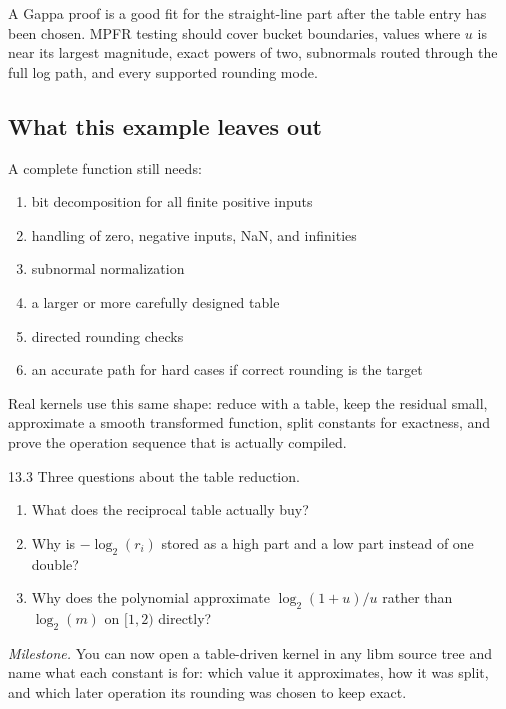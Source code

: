 \documentclass[manuscript, nonacm]{acmart}
\begin{document}
    A Gappa proof is a good fit for the straight-line part after the table entry
    has been chosen. MPFR testing should cover bucket boundaries, values where
    $u$ is near its largest magnitude, exact powers of two, subnormals routed
    through the full log path, and every supported rounding mode.

    \subsection{What this example leaves out}

    A complete function still needs:

    \begin{enumerate}
        \item bit decomposition for all finite positive inputs
        \item handling of zero, negative inputs, NaN, and infinities
        \item subnormal normalization
        \item a larger or more carefully designed table
        \item directed rounding checks
        \item an accurate path for hard cases if correct rounding is the target
    \end{enumerate}

    Real kernels use this same shape: reduce with a table, keep the residual
    small, approximate a smooth transformed function, split constants for
    exactness, and prove the operation sequence that is actually compiled.

    \begin{checkpoint}{13.3}
        Three questions about the table reduction.
        \begin{enumerate}
            \item What does the reciprocal table actually buy?
            \item Why is $-\log_2(r_i)$ stored as a high part and a low part instead
            of one double?
            \item Why does the polynomial approximate $\log_2(1 + u)/u$ rather than
            $\log_2(m)$ on $[1, 2)$ directly?
        \end{enumerate}
    \end{checkpoint}

    \emph{Milestone.}  You can now open a table-driven kernel in any libm
    source tree and name what each constant is for: which value it
    approximates, how it was split, and which later operation its rounding
    was chosen to keep exact.
\end{document}
